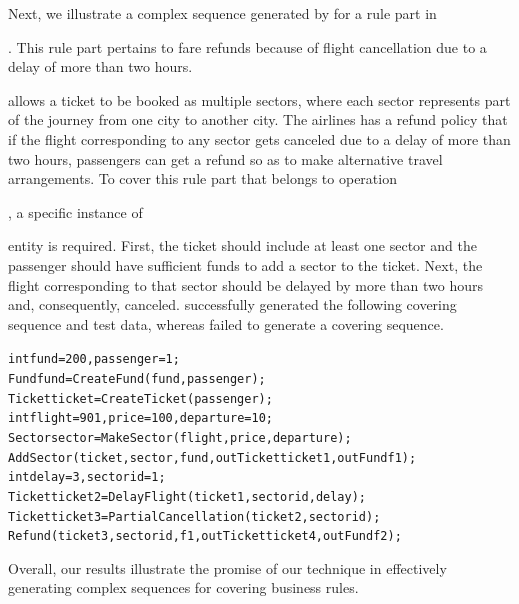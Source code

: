 
Next, we illustrate a complex sequence generated by \tool{} for a rule part in
\subject{Cebu-pacific}. This rule part pertains to fare refunds because of
flight cancellation due to a delay of more than two
hours. \subject{Cebu-pacific} allows a ticket to be booked as multiple sectors,
where each sector represents part of the journey from one city to another
city. The airlines has a refund policy that if the flight corresponding to any
sector gets canceled due to a delay of more than two hours, passengers can get a
refund so as to make alternative travel arrangements. To cover this rule part
that belongs to operation \subject{Refund}, a specific instance of
\subject{Ticket} entity is required. First, the ticket should include at least
one sector and the passenger should have sufficient funds to add a sector to the
ticket. Next, the flight corresponding to that sector should be delayed by more
than two hours and, consequently, canceled. \tool{} successfully generated the
following covering sequence and test data, whereas \exhaust{} failed to generate
a covering sequence.

{\scriptsize
\begin{alltt}
 int fund = 200, passenger = 1;
 Fund fund = CreateFund(fund, passenger);
 Ticket ticket = CreateTicket(passenger);
 int flight = 901, price = 100, departure = 10; 
 Sector sector = MakeSector(flight, price, departure);
 AddSector(ticket, sector, fund, out Ticket ticket1, out Fund f1);
 int delay = 3, sectorid = 1; 
 Ticket ticket2 = DelayFlight(ticket1, sectorid, delay);
 Ticket ticket3 = PartialCancellation(ticket2, sectorid);
 Refund(ticket3, sectorid, f1, out Ticket ticket4, out Fund f2);
\end{alltt}
}

Overall, our results illustrate the promise of our technique in effectively
generating complex sequences for covering business rules.

